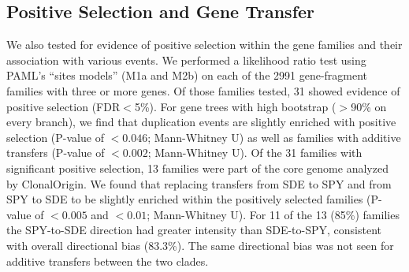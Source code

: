 \documentclass[12pt]{article}
\begin{document}







\subsection*{Positive Selection and Gene Transfer}
We also tested for evidence of positive selection within the gene
families and their association with various events.  We performed a
likelihood ratio test using PAML's ``sites models'' (M1a and M2b) on
each of the 2991 gene-fragment families with three or more genes.  Of
those families tested, 31 showed evidence of positive selection
(FDR$<$5\%).  For gene trees with high bootstrap ($>$90\% on every
branch), we find that duplication events are slightly enriched with
positive selection (P-value of $<0.046$; Mann-Whitney U) as well as
families with additive transfers (P-value of $<0.002$; Mann-Whitney
U).  Of the 31 families with significant positive selection, 13
families were part of the core genome analyzed by ClonalOrigin.  We
found that replacing transfers from SDE to SPY and from SPY to SDE to
be slightly enriched within the positively selected families (P-value
of $<0.005$ and $<0.01$; Mann-Whitney U).  For 11 of the 13
(85\%) families the SPY-to-SDE direction had greater intensity than
SDE-to-SPY, consistent with overall directional bias (83.3\%).  
The same directional bias was not seen for additive
transfers between the two clades.
\end{document}
